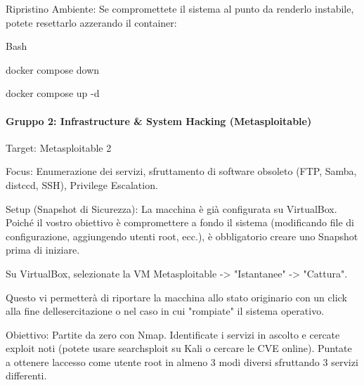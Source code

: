 \documentclass[11pt,a4paper]{article}
\begin{document}
Ripristino Ambiente: Se compromettete il sistema al punto da renderlo
instabile, potete resettarlo azzerando il container:

Bash

docker compose down

docker compose up -d

\paragraph{Gruppo 2: Infrastructure \& System Hacking
(Metasploitable)}\label{gruppo-2-infrastructure-system-hacking-metasploitable}

Target: Metasploitable 2

Focus: Enumerazione dei servizi, sfruttamento di software obsoleto (FTP,
Samba, distccd, SSH), Privilege Escalation.

Setup (Snapshot di Sicurezza): La macchina è già configurata su
VirtualBox. Poiché il vostro obiettivo è compromettere a fondo il
sistema (modificando file di configurazione, aggiungendo utenti root,
ecc.), è obbligatorio creare uno Snapshot prima di iniziare.

Su VirtualBox, selezionate la VM Metasploitable -\textgreater{}
"Istantanee" -\textgreater{} "Cattura".

Questo vi permetterà di riportare la macchina allo stato originario con
un click alla fine dell\textquotesingle esercitazione o nel caso in cui
"rompiate" il sistema operativo.

Obiettivo: Partite da zero con Nmap. Identificate i servizi in ascolto e
cercate exploit noti (potete usare searchsploit su Kali o cercare le CVE
online). Puntate a ottenere l\textquotesingle accesso come utente root
in almeno 3 modi diversi sfruttando 3 servizi differenti.
\end{document}
